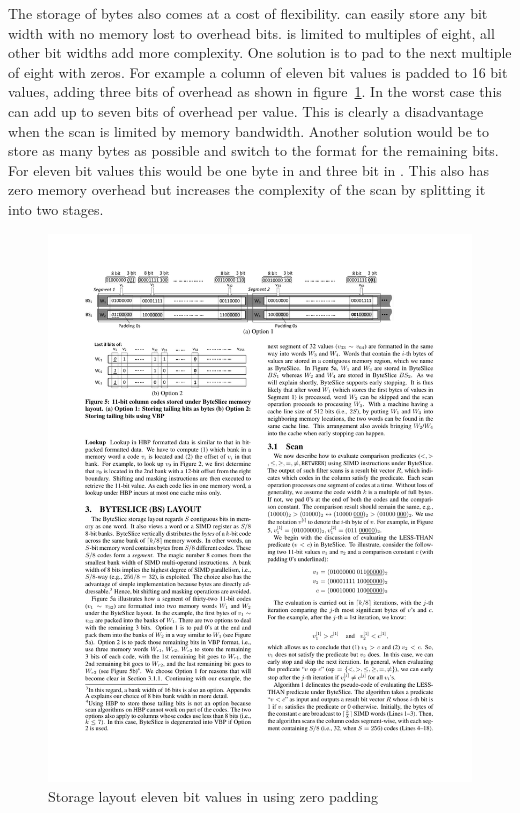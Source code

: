 The storage of bytes also comes at a cost of flexibility. \bwv{} can easily
store any bit width with no memory lost to overhead bits. \bs{} is limited to
multiples of eight, all other bit widths add more complexity. One solution is to
pad to the next multiple of eight with zeros. For example a column of eleven bit
values is padded to 16 bit values, adding three bits of overhead as shown in
figure~\ref{fig:bseleven}. In the worst case this can add up to seven bits of
overhead per value. This is clearly a disadvantage when the scan is limited by
memory bandwidth. Another solution would be to store as many bytes as possible
and switch to the \bwv{} format for the remaining bits. For eleven bit values
this would be one byte in \bs{} and three bit in \bwv{}. This also has zero
memory overhead but increases the complexity of the scan by splitting it into
two stages.

\begin{figure}[h] \begin{center}
\includegraphics[scale=1]{images/bytesliceelevenbits}
\end{center}
\caption{Storage layout eleven bit values in \bs{} using zero padding~\cite{ByteSlice}}
\label{fig:bseleven}
\end{figure}

